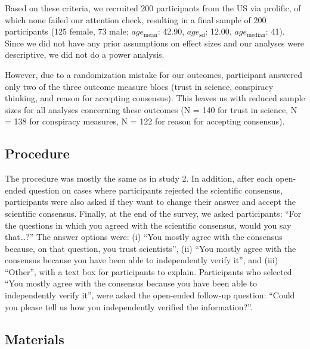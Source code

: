 \documentclass[
  doc,floatsintext]{apa6}
\begin{document}
Based on these criteria, we recruited 200 participants from the US via prolific, of which none failed our attention check, resulting in a final sample of 200 participants (125 female, 73 male; \(age_\text{mean}\): 42.90, \(age_\text{sd}\): 12.00, \(age_\text{median}\): 41). Since we did not have any prior assumptions on effect sizes and our analyses were descriptive, we did not do a power analysis.

However, due to a randomization mistake for our outcomes, participant answered only two of the three outcome measure blocs (trust in science, conspiracy thinking, and reason for accepting consensus). This leaves us with reduced sample sizes for all analyses concerning these outcomes (N = 140 for trust in science, N = 138 for conspiracy measures, N = 122 for reason for accepting consensus).

\subsection{Procedure}\label{procedure-2}

The procedure was mostly the same as in study 2. In addition, after each open-ended question on cases where participants rejected the scientific consensus, participants were also asked if they want to change their answer and accept the scientific consensus. Finally, at the end of the survey, we asked participants: ``For the questions in which you agreed with the scientific consensus, would you say that\ldots?'' The answer options were: (i) ``You mostly agree with the consensus because, on that question, you trust scientists'', (ii) ``You mostly agree with the consensus because you have been able to independently verify it'', and (iii) ``Other'', with a text box for participants to explain. Participants who selected ``You mostly agree with the consensus because you have been able to independently verify it'', were asked the open-ended follow-up question: ``Could you please tell us how you independently verified the information?''.

\subsection{Materials}\label{materials-4}

\FloatBarrier
\end{document}

